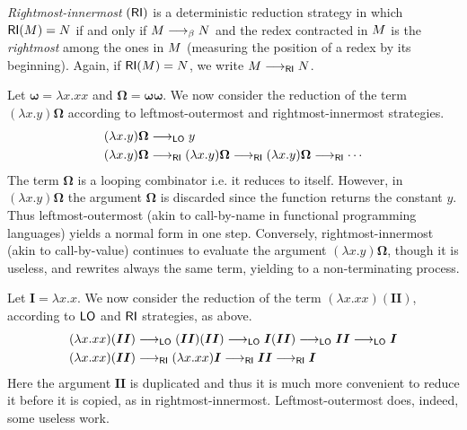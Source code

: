 \begin{definition}
	\emph{Rightmost-innermost} $(\textsf{RI})$ is a deterministic reduction
	strategy in which $\textsf{RI}(M)=N$ if and only if
	$M\longrightarrow_\beta N$ and the redex contracted in $M$ is
	the \emph{rightmost} among the ones in $M$ (measuring the
	position of a redex by its beginning). Again, if
	$\textsf{RI}(M)=N$, we write $M\longrightarrow_{\textsf{RI}}N$.
\end{definition}
\begin{example}\label{example:canc}
	Let $\bm{\omega}=\lambda x.xx$ and
	$\bm{\Omega}=\bm{\omega\omega}$. We now consider the reduction of
	the term $(\lambda x.y)\bm{\Omega}$ according to leftmost-outermost and
	rightmost-innermost strategies.
	\begin{align*}
		(\lambda x.y)\bm{\Omega}&\longrightarrow_{\textsf{LO}} y\\
		(\lambda x.y)\bm{\Omega}&\longrightarrow_{\textsf{RI}}(\lambda x.y)\bm{\Omega}\longrightarrow_{\textsf{RI}}(\lambda x.y)\bm{\Omega}\longrightarrow_{\textsf{RI}}\cdots
	\end{align*}
	The term $\bm{\Omega}$ is a looping combinator i.e. it reduces to
	itself. However, in $(\lambda x.y)\bm{\Omega}$ the argument
	$\bm{\Omega}$ is discarded since the function returns the constant
	$y$. Thus leftmost-outermost (akin to call-by-name in functional
	programming languages) yields a normal form in one step. Conversely,
	rightmost-innermost (akin to call-by-value) continues to evaluate
	the argument $(\lambda x.y)\bm{\Omega}$, though it is useless, and
	rewrites always the same term, yielding to a non-terminating
	process.
\end{example}
\begin{example}\label{example:copy}
	Let $\bm{I}=\lambda x.x$. We now consider the reduction of the term
	$(\lambda x.xx)(\bm{II})$, according to $\textsf{LO}$ and $\textsf{RI}$
	strategies, as above.
	\begin{align*}
		(\lambda x.xx)(\bm{II})&\longrightarrow_{\textsf{LO}} (\bm{II})(\bm{II}) \longrightarrow_{\textsf{LO}}
		\bm{I}(\bm{II}) \longrightarrow_{\textsf{LO}} \bm{II} \longrightarrow_{\textsf{LO}} \bm{I}\\
		(\lambda x.xx)(\bm{II})&\longrightarrow_{\textsf{RI}} (\lambda x.xx)\bm{I} \longrightarrow_{\textsf{RI}} \bm{II} \longrightarrow_{\textsf{RI}} \bm{I}
	\end{align*}
	Here the argument $\bm{II}$ is duplicated and thus it is much more convenient
	to reduce it before it is copied, as in
	rightmost-innermost. Leftmost-outermost does, indeed, some useless
	work.
\end{example}

